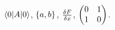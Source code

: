 \documentclass{article}
\begin{document}
$\vev{A}$, $\acommutator{a}{b}$, $\fderivative{F}{x}$, $\mqty(\paulixmatrix)$.
\end{document}

